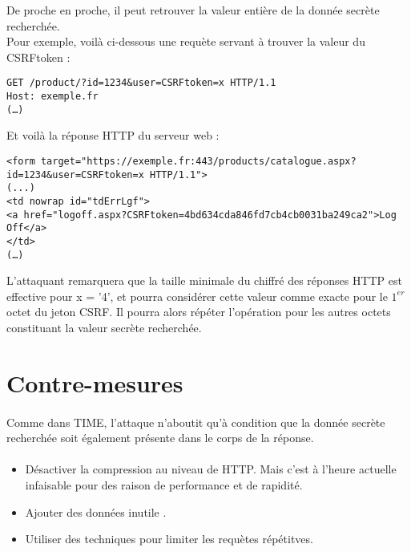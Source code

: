 De proche en proche, il peut retrouver la valeur entière de la donnée secrète recherchée.\\

Pour exemple, voilà ci-dessous une requète servant à trouver la valeur du CSRFtoken :

\begin{verbatim}
GET /product/?id=1234&user=CSRFtoken=x HTTP/1.1
Host: exemple.fr
(…)
\end{verbatim}

Et voilà la réponse HTTP du serveur web :

\begin{verbatim}
<form target="https://exemple.fr:443/products/catalogue.aspx?id=1234&user=CSRFtoken=x HTTP/1.1">
(...)
<td nowrap id="tdErrLgf">
<a href="logoff.aspx?CSRFtoken=4bd634cda846fd7cb4cb0031ba249ca2">Log Off</a>
</td>
(…)
\end{verbatim}

L'attaquant remarquera que la taille minimale du chiffré des réponses HTTP est effective pour x = '4', et pourra considérer cette valeur comme exacte pour le $1^{er}$ octet du jeton CSRF. Il pourra alors répéter l'opération pour les autres octets constituant la valeur secrète recherchée.

\section{Contre-mesures}
\paragraph{}
Comme dans TIME, l'attaque n'aboutit qu'à condition que la donnée secrète recherchée soit également présente dans le corps de la réponse.

\paragraph{}
\begin{itemize}
  \item Désactiver la compression au niveau de HTTP. Mais c'est à l'heure actuelle infaisable pour des raison de performance et de rapidité.
  \item Ajouter des données inutile .
  \item Utiliser des techniques pour limiter les requètes répétitves.
\end{itemize}
